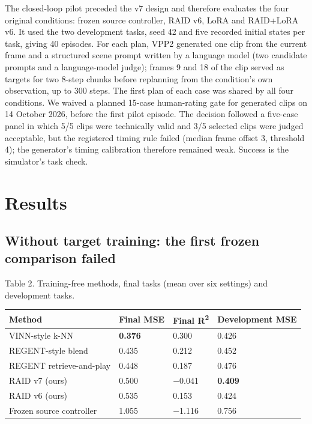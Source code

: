 \documentclass[11pt,a4paper]{article}
\begin{document}
The closed-loop pilot preceded the v7 design and therefore evaluates the four original conditions: frozen source controller, RAID v6, LoRA and RAID+LoRA v6. It used the two development tasks, seed 42 and five recorded initial states per task, giving 40 episodes. For each plan, VPP2 generated one clip from the current frame and a structured scene prompt written by a language model (two candidate prompts and a language-model judge); frames 9 and 18 of the clip served as targets for two 8-step chunks before replanning from the condition's own observation, up to 300 steps. The first plan of each case was shared by all four conditions. We waived a planned 15-case human-rating gate for generated clips on 14 October 2026, before the first pilot episode. The decision followed a five-case panel in which 5/5 clips were technically valid and 3/5 selected clips were judged acceptable, but the registered timing rule failed (median frame offset 3, threshold 4); the generator's timing calibration therefore remained weak. Success is the simulator's task check.

\section{Results}

\subsection{Without target training: the first frozen comparison failed}


Table 2. Training-free methods, final tasks (mean over six settings) and development tasks.

{\def\LTcaptype{none} %
{\small
\begin{longtable}[]{@{}llll@{}}
\toprule\noalign{}
Method & Final MSE & Final R\textsuperscript{2} & Development MSE \\
\midrule\noalign{}
\endhead
\bottomrule\noalign{}
\endlastfoot
VINN-style k-NN & \textbf{0.376} & 0.300 & 0.426 \\
REGENT-style blend & 0.435 & 0.212 & 0.452 \\
REGENT retrieve-and-play & 0.448 & 0.187 & 0.476 \\
RAID v7 (ours) & 0.500 & \ensuremath{-}0.041 & \textbf{0.409} \\
RAID v6 (ours) & 0.535 & 0.153 & 0.424 \\
Frozen source controller & 1.055 & \ensuremath{-}1.116 & 0.756 \\
\end{longtable}
}
}
\end{document}
